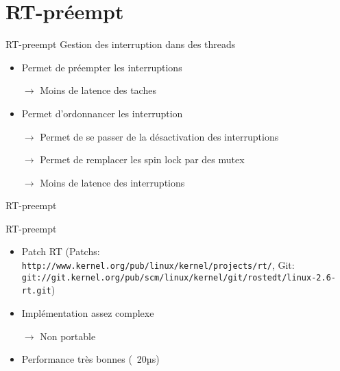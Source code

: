 \section{RT-préempt} %

\begin{frame}{RT-preempt} %
  Gestion des interruption dans des threads
  \begin{itemize}
    \item Permet de préempter les interruptions
    \item[$\to$] Moins de latence des taches
    \item Permet d'ordonnancer les interruption
    \item[$\to$] Permet de se passer de la désactivation des interruptions
    \item[$\to$] Permet de remplacer les spin lock par des mutex
    \item[$\to$] Moins de latence des interruptions
  \end{itemize}
\end{frame}

\begin{frame}{RT-preempt} 
  \begin{center}
  \end{center}
\end{frame}

\begin{frame}{RT-preempt}
 \begin{itemize}
  \item Patch RT (Patchs: \texttt{http://www.kernel.org/pub/linux/kernel/projects/rt/}, Git: \texttt{git://git.kernel.org/pub/scm/linux/kernel/git/rostedt/linux-2.6-rt.git})
  \item Implémentation assez complexe
  \item[$\to$] Non portable
  \item Performance très bonnes (~20µs)
 \end{itemize}
\end{frame}

